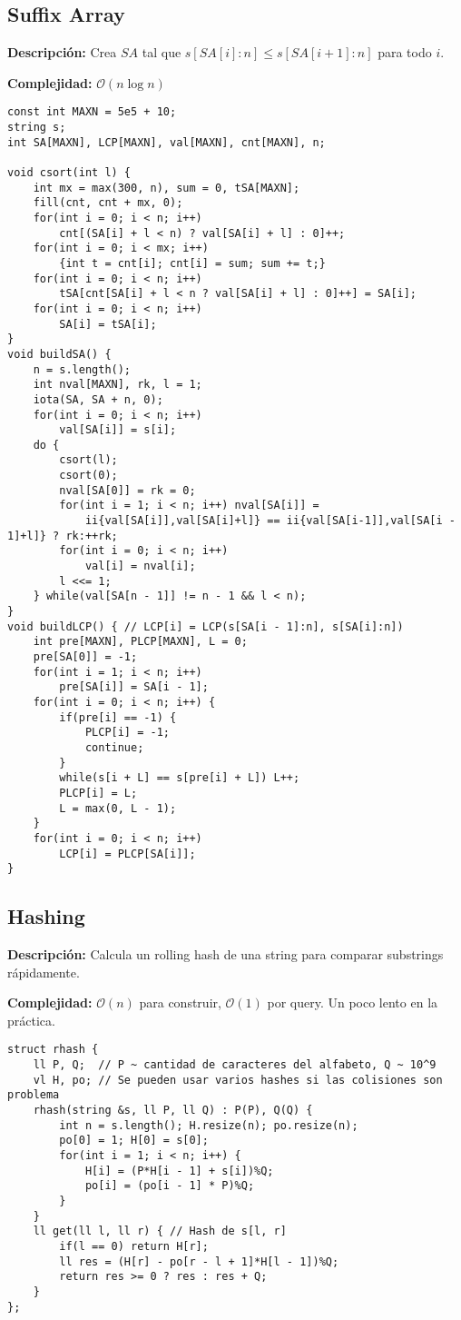 \documentclass[twocolumn]{article}
\begin{document}
\subsection{Suffix Array}
\begin{footnotesize}{\bf Descripción: } Crea $SA$ tal que $s[SA[i]:n] \leq s[SA[i + 1]:n]$ para todo $i$.


{\bf Complejidad: } $\mathcal{O}(n \log n)$
\end{footnotesize}\lstset{basicstyle=\footnotesize\ttfamily,breaklines=true,tabsize=2,language=C++,frame=leftline, numbers=left, numberstyle=\tiny, numbersep=5pt}
\begin{lstlisting}
const int MAXN = 5e5 + 10;
string s;
int SA[MAXN], LCP[MAXN], val[MAXN], cnt[MAXN], n;

void csort(int l) {
	int mx = max(300, n), sum = 0, tSA[MAXN];
	fill(cnt, cnt + mx, 0);
	for(int i = 0; i < n; i++)
		cnt[(SA[i] + l < n) ? val[SA[i] + l] : 0]++;
	for(int i = 0; i < mx; i++)
		{int t = cnt[i]; cnt[i] = sum; sum += t;}
	for(int i = 0; i < n; i++)
		tSA[cnt[SA[i] + l < n ? val[SA[i] + l] : 0]++] = SA[i];
	for(int i = 0; i < n; i++)
		SA[i] = tSA[i];
}
void buildSA() {
	n = s.length();
	int nval[MAXN], rk, l = 1;
	iota(SA, SA + n, 0);
	for(int i = 0; i < n; i++)
		val[SA[i]] = s[i];
	do {
		csort(l);
		csort(0);
		nval[SA[0]] = rk = 0;
		for(int i = 1; i < n; i++) nval[SA[i]] =
			ii{val[SA[i]],val[SA[i]+l]} == ii{val[SA[i-1]],val[SA[i - 1]+l]} ? rk:++rk;
		for(int i = 0; i < n; i++)
			val[i] = nval[i];
		l <<= 1;
	} while(val[SA[n - 1]] != n - 1 && l < n);
}
void buildLCP() { // LCP[i] = LCP(s[SA[i - 1]:n], s[SA[i]:n])
	int pre[MAXN], PLCP[MAXN], L = 0;
	pre[SA[0]] = -1;
	for(int i = 1; i < n; i++)
		pre[SA[i]] = SA[i - 1];
	for(int i = 0; i < n; i++) {
		if(pre[i] == -1) {
			PLCP[i] = -1;
			continue;
		}
		while(s[i + L] == s[pre[i] + L]) L++;
		PLCP[i] = L;
		L = max(0, L - 1);
	}
	for(int i = 0; i < n; i++)
		LCP[i] = PLCP[SA[i]];
}
\end{lstlisting}
\subsection{Hashing}
\begin{footnotesize}{\bf Descripción: } Calcula un rolling hash de una string para comparar substrings rápidamente.


{\bf Complejidad: } $\mathcal{O}(n)$ para construir, $\mathcal{O}(1)$ por query. Un poco lento en la práctica.
\end{footnotesize}\lstset{basicstyle=\footnotesize\ttfamily,breaklines=true,tabsize=2,language=C++,frame=leftline, numbers=left, numberstyle=\tiny, numbersep=5pt}
\begin{lstlisting}
struct rhash {
	ll P, Q;  // P ~ cantidad de caracteres del alfabeto, Q ~ 10^9
	vl H, po; // Se pueden usar varios hashes si las colisiones son problema
	rhash(string &s, ll P, ll Q) : P(P), Q(Q) {
		int n = s.length(); H.resize(n); po.resize(n);
		po[0] = 1; H[0] = s[0];
		for(int i = 1; i < n; i++) {
			H[i] = (P*H[i - 1] + s[i])%Q;
			po[i] = (po[i - 1] * P)%Q;
		}
	}
	ll get(ll l, ll r) { // Hash de s[l, r]
		if(l == 0) return H[r];
		ll res = (H[r] - po[r - l + 1]*H[l - 1])%Q;
		return res >= 0 ? res : res + Q;
	}
};
\end{lstlisting}
\end{document}
